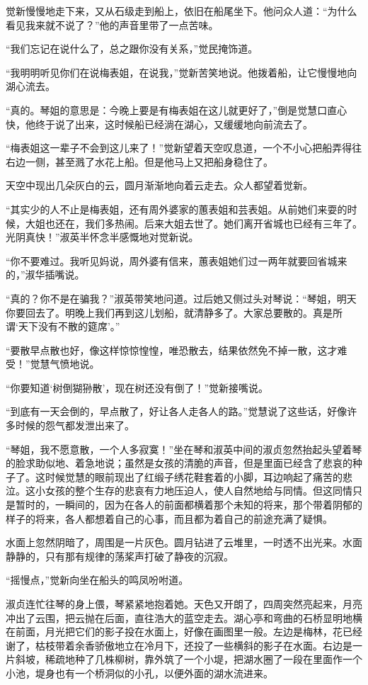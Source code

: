 \par 觉新慢慢地走下来，又从石级走到船上，依旧在船尾坐下。他问众人道：“为什么看见我来就不说了？”他的声音里带了一点苦味。
\par “我们忘记在说什么了，总之跟你没有关系，”觉民掩饰道。
\par “我明明听见你们在说梅表姐，在说我，”觉新苦笑地说。他拨着船，让它慢慢地向湖心流去。
\par “真的。琴姐的意思是：今晚上要是有梅表姐在这儿就更好了，”倒是觉慧口直心快，他终于说了出来，这时候船已经淌在湖心，又缓缓地向前流去了。
\par “梅表姐这一辈子不会到这儿来了！”觉新望着天空叹息道，一个不小心把船弄得往右边一侧，甚至溅了水花上船。但是他马上又把船身稳住了。
\par 天空中现出几朵灰白的云，圆月渐渐地向着云走去。众人都望着觉新。
\par “其实少的人不止是梅表姐，还有周外婆家的蕙表姐和芸表姐。从前她们来耍的时候，大姐也还在，我们多热闹。后来大姐去世了。她们离开省城也已经有三年了。光阴真快！”淑英半怀念半感慨地对觉新说。
\par “你不要难过。我听见妈说，周外婆有信来，蕙表姐她们过一两年就要回省城来的，”淑华插嘴说。
\par “真的？你不是在骗我？”淑英带笑地问道。过后她又侧过头对琴说：“琴姐，明天你要回去了。明晚上我们再到这儿划船，就清静多了。大家总要散的。真是所谓‘天下没有不散的筵席’。”
\par “要散早点散也好，像这样惊惊惶惶，唯恐散去，结果依然免不掉一散，这才难受！”觉慧气愤地说。
\par “你要知道‘树倒猢狲散’，现在树还没有倒了！”觉新接嘴说。
\par “到底有一天会倒的，早点散了，好让各人走各人的路。”觉慧说了这些话，好像许多时候的怨气都发泄出来了。
\par “琴姐，我不愿意散，一个人多寂寞！”坐在琴和淑英中间的淑贞忽然抬起头望着琴的脸求助似地、着急地说；虽然是女孩的清脆的声音，但是里面已经含了悲哀的种子了。这时候觉慧的眼前现出了红缎子绣花鞋套着的小脚，耳边响起了痛苦的悲泣。这小女孩的整个生存的悲哀有力地压迫人，使人自然地给与同情。但这同情只是暂时的，一瞬间的，因为在各人的前面都横着那个未知的将来，那个带着阴郁的样子的将来，各人都想着自己的心事，而且都为着自己的前途充满了疑惧。
\par 水面上忽然阴暗了，周围是一片灰色。圆月钻进了云堆里，一时透不出光来。水面静静的，只有那有规律的荡桨声打破了静夜的沉寂。
\par “摇慢点，”觉新向坐在船头的鸣凤吩咐道。
\par 淑贞连忙往琴的身上偎，琴紧紧地抱着她。天色又开朗了，四周突然亮起来，月亮冲出了云围，把云抛在后面，直往浩大的蓝空走去。湖心亭和弯曲的石桥显明地横在前面，月光把它们的影子投在水面上，好像在画图里一般。左边是梅林，花已经谢了，枯枝带着余香骄傲地立在冷月下，还投了一些横斜的影子在水面。右边是一片斜坡，稀疏地种了几株柳树，靠外筑了一个小堤，把湖水圈了一段在里面作一个小池，堤身也有一个桥洞似的小孔，以便外面的湖水流进来。
